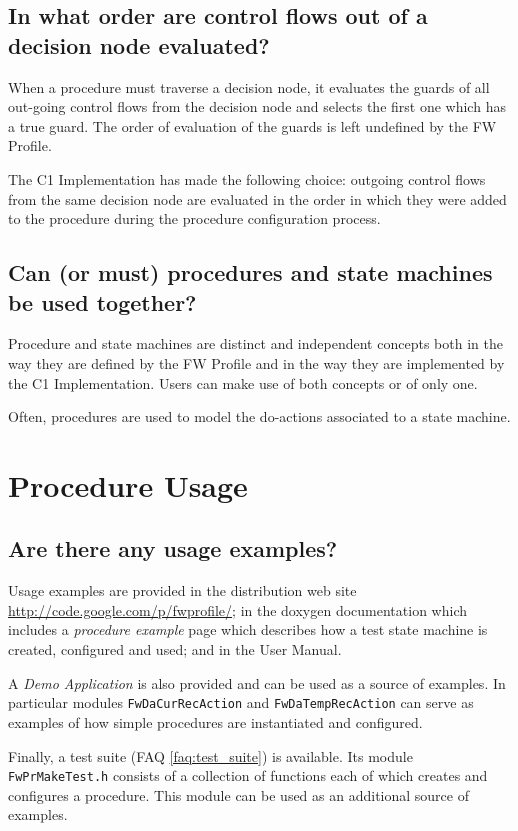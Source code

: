 \documentclass[a4paper,10pt]{article}
\let\stdsection\section
\renewcommand\section{\newpage\stdsection}
\begin{document}
\subsection{In what order are control flows out of a decision node evaluated?}
When a procedure must traverse a decision node, it evaluates the guards of all out-going control flows from the decision node and selects the first 
one which has a true guard. The order of evaluation of the guards is left undefined by the FW Profile. 

The C1 Implementation has made the following choice: outgoing control flows from the same decision node are evaluated in the order in which they were added 
to the procedure during the procedure configuration process.

\subsection{Can (or must) procedures and state machines be used together?}
Procedure and state machines are distinct and independent concepts both in the way they are defined by the FW Profile and in the way they are implemented 
by the C1 Implementation. Users can make use of both concepts or of only one. 

Often, procedures are used to model the do-actions associated to a state machine.

\section{Procedure Usage}

\subsection{Are there any usage examples?}
Usage examples are provided in the distribution web site 
\url{http://code.google.com/p/fwprofile/}; in 
the doxygen documentation which includes a \emph{procedure example} page which describes how a test state machine is created, configured and used; and in the User Manual.

A \emph{Demo Application} is also provided and can be used as a source of examples. In particular modules \texttt{FwDaCurRecAction} and \texttt{FwDaTempRecAction} can serve as examples of how simple procedures are instantiated and configured.

Finally, a test suite (FAQ \ref{faq:test_suite}) is available. Its module \texttt{FwPrMakeTest.h} consists of a collection of functions each 
of which creates and configures a procedure. This module can be used as an additional source of examples.
\end{document}
